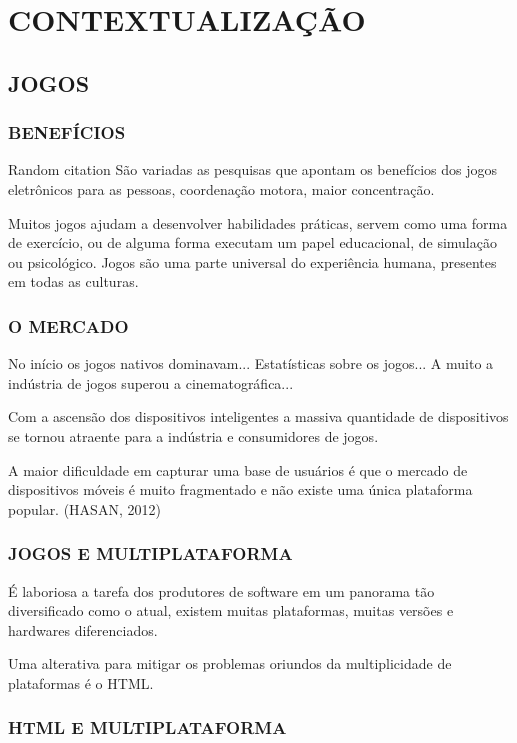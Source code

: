 \documentclass[11pt,a4paper]{article}
\author{Jean Carlo Machado}
\title{}
\begin{document}

\section{CONTEXTUALIZAÇÃO}
\subsection{JOGOS}

\subsubsection{BENEFÍCIOS}
Random citation \cite{ahu61} 
São variadas as pesquisas que apontam os benefícios dos jogos
eletrônicos para as pessoas, coordenação motora, maior
concentração.

Muitos jogos ajudam a desenvolver habilidades práticas, servem como uma
forma de exercício, ou de alguma forma executam um papel educacional,
de simulação ou psicológico. Jogos são uma parte universal do
experiência humana, presentes em todas as culturas.

\subsubsection{O MERCADO}
No início os jogos nativos dominavam...
Estatísticas sobre os jogos...
A muito a indústria de jogos superou a cinematográfica...

Com a ascensão dos dispositivos inteligentes a massiva quantidade de
dispositivos se tornou atraente para a indústria e consumidores de
jogos.

A maior dificuldade em capturar uma base de usuários é que o mercado
de dispositivos móveis é muito fragmentado e não existe uma única
plataforma popular. (HASAN, 2012)

\subsubsection{JOGOS E MULTIPLATAFORMA}

É laboriosa a tarefa dos produtores de software em um panorama tão
diversificado como o atual, existem muitas plataformas, muitas versões
e hardwares diferenciados.

Uma alterativa para mitigar os problemas oriundos da multiplicidade de
plataformas é o HTML.

\subsubsection{HTML E MULTIPLATAFORMA}
\end{document}
